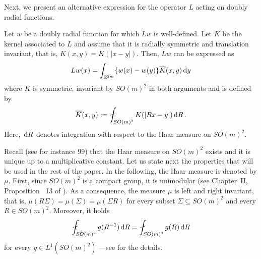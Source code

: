 Next, we present an alternative expression for the operator $L$ acting on doubly radial functions.

\begin{lemma} \label{Lemma:AlternativeOperatorExpression}
	Let $w$ be a doubly radial function for which $Lw$ is well-defined. Let $K$ be the kernel associated to $L$ and assume that it is radially symmetric and translation invariant, that is, $K(x,y) = K(|x-y|)$. Then, $Lw$ can be expressed as
	$$
	Lw(x) = \int_{\mathbb{R}^{2m}} \{w(x) - w(y)\} \overline{K}(x,y) \,\mathrm{d} y
	$$
	where $\overline{K}$ is symmetric, invariant by $SO(m)^2$ in both arguments and is defined by
	\begin{equation}
	\label{Eq:KbarDef}
    \overline{K}(x,y) := \average_{SO(m)^2} K(|Rx - y|)\d R\,.
	\end{equation}
	Here, $\,\mathrm{d} R$ denotes integration with respect to the Haar measure on $SO(m)^2$.
\end{lemma}

Recall (see for instance 99) that the Haar measure on $SO(m)^2$ exists and it is unique up to a multiplicative constant. Let us state next the properties that will be used in the rest of the paper. In the following, the Haar measure is denoted by $\mu$. First, since $SO(m)^2$ is a compact group, it is unimodular (see Chapter~II, Proposition~ 13 of \cite{Nachbin}). As a consequence, the measure $\mu$ is left and right invariant, that is, $\mu(R\Sigma) = \mu(\Sigma) = \mu(\Sigma R) $ for every subset $\Sigma \subseteq SO(m)^2$ and every $R\in SO(m)^2$. Moreover, it holds
\begin{equation}
	\label{Eq:Unimodular}
	\average_{SO(m)^2} g(R^{-1}) \d R = 
	\average_{SO(m)^2} g(R) \d R
\end{equation}	
for every $g\in L^1(SO(m)^2)$ ---see \cite{Nachbin} for the details.


